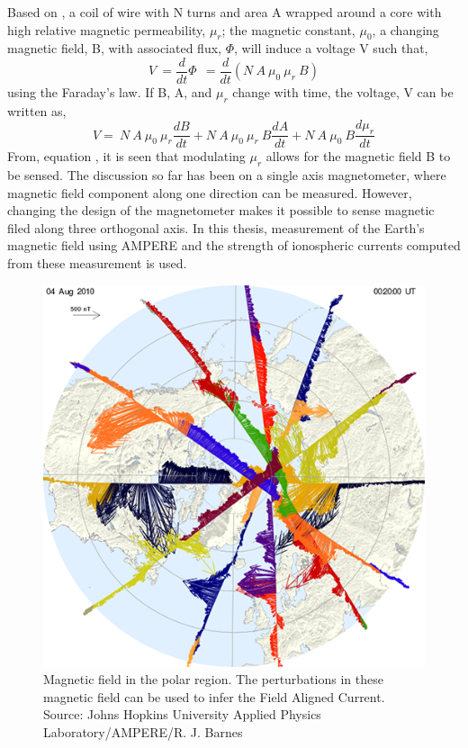 \documentclass[crop=false,class=mitthesis,oneside,font=12pt]{standalone}
\begin{document}
Based on \citep{ripka2001magnetic}, a coil of wire with N turns and area A wrapped around a core with high relative magnetic permeability, $\mu_r$; the magnetic constant, $\mu_0$, a changing magnetic field, B, with associated flux, $\Phi$, will induce a voltage V such that,
\begin{equation*}
V~= \frac{d}{dt}\Phi~~=\frac{d}{dt}(N~A~\mu_{0}~\mu_{r}~B)
\end{equation*}using the Faraday's law. If B, A, and $\mu_r$ change with time, the voltage, V can be written as,
\begin{equation}
V=~N~A~\mu_{0}~\mu_{r}\frac{dB}{dt}+N~A~\mu_{0}~\mu_{r}~B\frac{dA}{dt}+N~A~\mu_{0}~B\frac{d\mu_{r}}{dt}
\end{equation}
From, equation \theequation, it is seen that modulating $\mu_r$ allows for the magnetic field B to be sensed. The discussion so far has been on a single axis magnetometer, where magnetic field component along one direction can be measured. However, changing the design of the magnetometer makes it possible to sense magnetic filed along three orthogonal axis. In this thesis, measurement of the Earth's magnetic field using AMPERE and the strength of ionospheric currents computed from these measurement is used.
\begin{figure}[H]
	\centering\includegraphics[width=30pc]{fac_s.png}
	\caption{Magnetic field in the polar region. The perturbations in these magnetic field can be used to infer the Field Aligned Current. Source: Johns Hopkins University Applied Physics Laboratory/AMPERE/R. J. Barnes}
	\label{fig:fac_s}
\end{figure}
\end{document}

